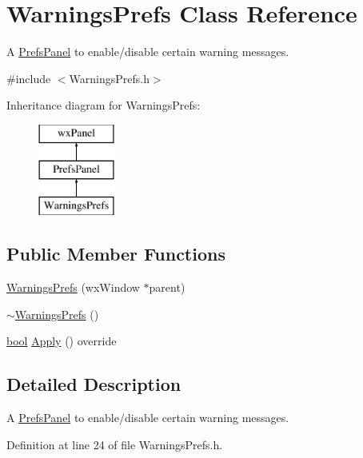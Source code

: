 \hypertarget{class_warnings_prefs}{}\section{Warnings\+Prefs Class Reference}
\label{class_warnings_prefs}


A \hyperlink{class_prefs_panel}{Prefs\+Panel} to enable/disable certain warning messages.  




{\ttfamily \#include $<$Warnings\+Prefs.\+h$>$}

Inheritance diagram for Warnings\+Prefs\+:\begin{figure}[H]
\begin{center}
\leavevmode
\includegraphics[height=3.000000cm]{class_warnings_prefs}
\end{center}
\end{figure}
\subsection*{Public Member Functions}
\begin{DoxyCompactItemize}
\item 
\hyperlink{class_warnings_prefs_ab4f52cd141dad6895f2f4ff5a11a9757}{Warnings\+Prefs} (wx\+Window $\ast$parent)
\item 
\hyperlink{class_warnings_prefs_aacfbbdd9a07f917e3384ba24aa25234f}{$\sim$\+Warnings\+Prefs} ()
\item 
\hyperlink{mac_2config_2i386_2lib-src_2libsoxr_2soxr-config_8h_abb452686968e48b67397da5f97445f5b}{bool} \hyperlink{class_warnings_prefs_aa4dcaa184e093c34800beb4c01280857}{Apply} () override
\end{DoxyCompactItemize}


\subsection{Detailed Description}
A \hyperlink{class_prefs_panel}{Prefs\+Panel} to enable/disable certain warning messages. 

Definition at line 24 of file Warnings\+Prefs.\+h.



